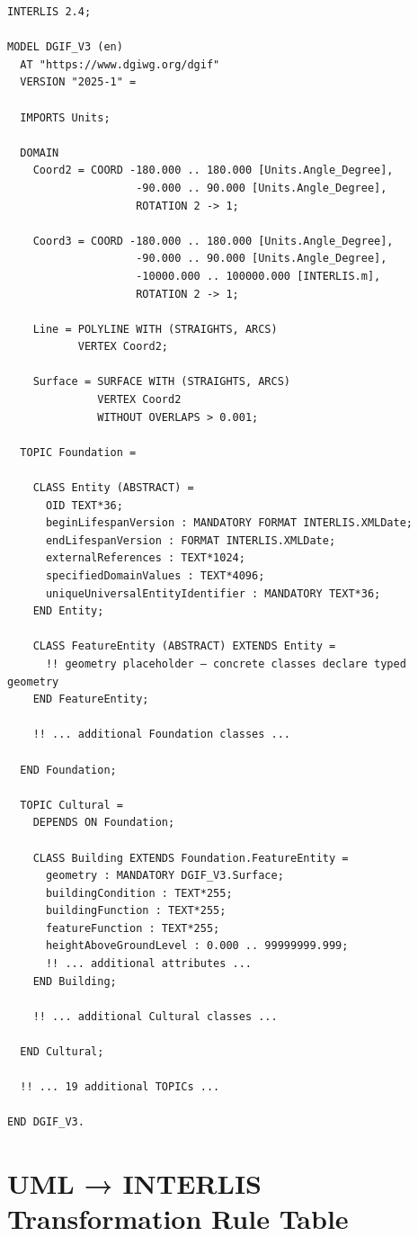 \documentclass[conference]{IEEEtran}
\begin{document}
\begin{lstlisting}
INTERLIS 2.4;

MODEL DGIF_V3 (en)
  AT "https://www.dgiwg.org/dgif"
  VERSION "2025-1" =

  IMPORTS Units;

  DOMAIN
    Coord2 = COORD -180.000 .. 180.000 [Units.Angle_Degree],
                    -90.000 .. 90.000 [Units.Angle_Degree],
                    ROTATION 2 -> 1;

    Coord3 = COORD -180.000 .. 180.000 [Units.Angle_Degree],
                    -90.000 .. 90.000 [Units.Angle_Degree],
                    -10000.000 .. 100000.000 [INTERLIS.m],
                    ROTATION 2 -> 1;

    Line = POLYLINE WITH (STRAIGHTS, ARCS)
           VERTEX Coord2;

    Surface = SURFACE WITH (STRAIGHTS, ARCS)
              VERTEX Coord2
              WITHOUT OVERLAPS > 0.001;

  TOPIC Foundation =

    CLASS Entity (ABSTRACT) =
      OID TEXT*36;
      beginLifespanVersion : MANDATORY FORMAT INTERLIS.XMLDate;
      endLifespanVersion : FORMAT INTERLIS.XMLDate;
      externalReferences : TEXT*1024;
      specifiedDomainValues : TEXT*4096;
      uniqueUniversalEntityIdentifier : MANDATORY TEXT*36;
    END Entity;

    CLASS FeatureEntity (ABSTRACT) EXTENDS Entity =
      !! geometry placeholder — concrete classes declare typed geometry
    END FeatureEntity;

    !! ... additional Foundation classes ...

  END Foundation;

  TOPIC Cultural =
    DEPENDS ON Foundation;

    CLASS Building EXTENDS Foundation.FeatureEntity =
      geometry : MANDATORY DGIF_V3.Surface;
      buildingCondition : TEXT*255;
      buildingFunction : TEXT*255;
      featureFunction : TEXT*255;
      heightAboveGroundLevel : 0.000 .. 99999999.999;
      !! ... additional attributes ...
    END Building;

    !! ... additional Cultural classes ...

  END Cultural;

  !! ... 19 additional TOPICs ...

END DGIF_V3.
\end{lstlisting}




\section{UML → INTERLIS Transformation Rule Table}
\end{document}
